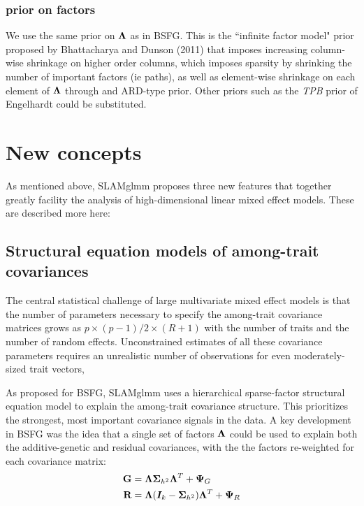 \documentclass[11pt]{amsart}
\newcommand*{\B}[1]{\ifmmode\bm{#1}\else\textbf{#1}\fi}
\begin{document}
\subsubsection{prior on factors}
We use the same prior on $\B{\Lambda}$ as in BSFG. This is the ``infinite factor model" prior proposed by Bhattacharya and Dunson (2011) that imposes increasing column-wise shrinkage on higher order columns, which imposes sparsity by shrinking the number of important factors (ie paths), as well as element-wise shrinkage on each element of $\B{\Lambda}$ through and ARD-type prior. Other priors such as the \emph{TPB} prior of Engelhardt could be substituted. 

\section{New concepts}
As mentioned above, SLAMglmm proposes three new features that together greatly facility the analysis of high-dimensional linear mixed effect models. These are described more here:

\subsection{Structural equation models of among-trait covariances}
The central statistical challenge of large multivariate mixed effect models is that the number of parameters necessary to specify the among-trait covariance matrices grows as $p\times(p-1)/2 \times (R+1)$ with the number of traits and the number of random effects. Unconstrained estimates of all these covariance parameters requires an unrealistic number of observations for even moderately-sized trait vectors,

As proposed for BSFG, SLAMglmm uses a hierarchical sparse-factor structural equation model to explain the among-trait covariance structure. This prioritizes the strongest, most important covariance signals in the data. A key development in BSFG was the idea that a single set of factors $\B{\Lambda}$ could be used to explain both the additive-genetic and residual covariances, with the the factors re-weighted for each covariance matrix:
\begin{align}\begin{split}
\B{G} &= \B{\Lambda} \B{\Sigma}_{h^2} \B{\Lambda}^T + \B{\Psi}_G \\
\B{R} &= \B{\Lambda} (\B{I}_k - \B{\Sigma}_{h^2}) \B{\Lambda}^T + \B{\Psi}_R 
\end{split} \end{align}
\end{document}
